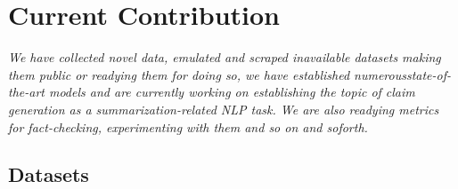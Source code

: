 
\chapter{Current Contribution}
\label{chap:contribution}

\textit{We have collected novel data, emulated and scraped inavailable datasets making them public or readying them for doing so, we have established numerousstate-of-the-art models and are currently working on establishing the topic of claim generation as a summarization-related NLP task.
We are also readying metrics for fact-checking, experimenting with them and so on and soforth.}

\section{Datasets}
\label{sec:datasets}
